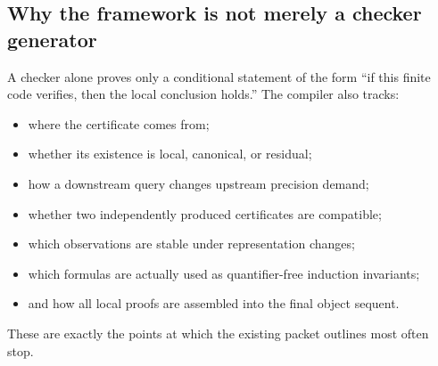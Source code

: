 \subsection{Why the framework is not merely a checker generator}

A checker alone proves only a conditional statement of the form ``if this
finite code verifies, then the local conclusion holds.''  The compiler also
tracks:

\begin{itemize}
\item where the certificate comes from;
\item whether its existence is local, canonical, or residual;
\item how a downstream query changes upstream precision demand;
\item whether two independently produced certificates are compatible;
\item which observations are stable under representation changes;
\item which formulas are actually used as quantifier-free induction
      invariants;
\item and how all local proofs are assembled into the final object sequent.
\end{itemize}

These are exactly the points at which the existing packet outlines most often
stop.
